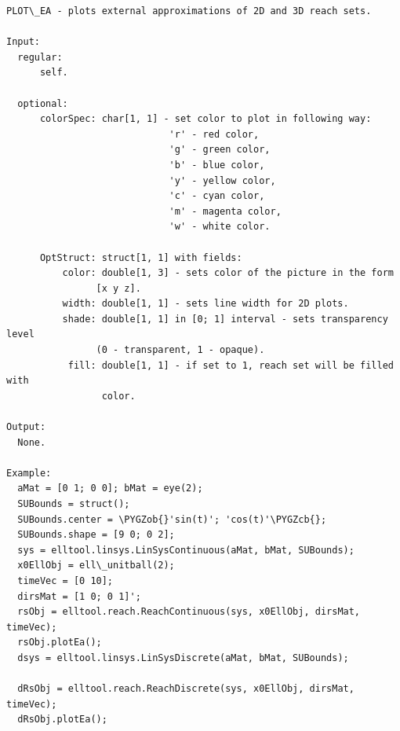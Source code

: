 \documentclass[letterpaper,10pt,english]{sphinxmanual}
\def\PYGZob{\char`\{}
\def\PYGZcb{\char`\}}
\begin{document}
\label{chap_func:elltool-reach-areach-plotea}
\begin{Verbatim}[commandchars=\\\{\}]
PLOT\_EA - plots external approximations of 2D and 3D reach sets.

Input:
  regular:
      self.

  optional:
      colorSpec: char[1, 1] - set color to plot in following way:
                             'r' - red color,
                             'g' - green color,
                             'b' - blue color,
                             'y' - yellow color,
                             'c' - cyan color,
                             'm' - magenta color,
                             'w' - white color.

      OptStruct: struct[1, 1] with fields:
          color: double[1, 3] - sets color of the picture in the form
                [x y z].
          width: double[1, 1] - sets line width for 2D plots.
          shade: double[1, 1] in [0; 1] interval - sets transparency level
                (0 - transparent, 1 - opaque).
           fill: double[1, 1] - if set to 1, reach set will be filled with
                 color.

Output:
  None.

Example:
  aMat = [0 1; 0 0]; bMat = eye(2);
  SUBounds = struct();
  SUBounds.center = \PYGZob{}'sin(t)'; 'cos(t)'\PYGZcb{};
  SUBounds.shape = [9 0; 0 2];
  sys = elltool.linsys.LinSysContinuous(aMat, bMat, SUBounds);
  x0EllObj = ell\_unitball(2);
  timeVec = [0 10];
  dirsMat = [1 0; 0 1]';
  rsObj = elltool.reach.ReachContinuous(sys, x0EllObj, dirsMat, timeVec);
  rsObj.plotEa();
  dsys = elltool.linsys.LinSysDiscrete(aMat, bMat, SUBounds);

  dRsObj = elltool.reach.ReachDiscrete(sys, x0EllObj, dirsMat, timeVec);
  dRsObj.plotEa();
\end{Verbatim}
\label{chap_func:elltool-reach-areach-plotia}
\end{document}
